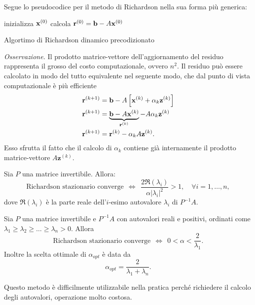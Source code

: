 Segue lo pseudocodice per il metodo di Richardson nella sua forma più generica: \\
\begin{algo}
	inizializza $\mathbf{x}^{(0)}$\;
	calcola $\mathbf{r}^{(0)} =\mathbf{b} -A\mathbf{x}^{(0)}$\;
	\caption{Algortimo di Richardson dinamico precodizionato}
\end{algo}
\textit{Osservazione.} Il prodotto matrice-vettore dell'aggiornamento del residuo rappresenta il grosso del costo computazionale, ovvero $n^{2}$. Il residuo può essere calcolato in modo del tutto equivalente nel seguente modo, che dal punto di vista computazionale è più efficiente
\begin{align*}
\mathbf{r}^{( k+1)} & =\mathbf{b} -A\left[\mathbf{x}^{(k)} +\alpha _{k}\mathbf{z}^{(k)}\right]\\
\mathbf{r}^{( k+1)} & =\underbrace{\mathbf{b} -A\mathbf{x}^{(k)}}_{\mathbf{r}^{(k)}} -A\alpha _{k}\mathbf{z}^{(k)}\\
\mathbf{r}^{( k+1)} & =\mathbf{r}^{(k)} -\alpha _{k} A\mathbf{z}^{(k)}.
\end{align*}
Esso sfrutta il fatto che il calcolo di $\alpha _{k}$ contiene già internamente il prodotto matrice-vettore $A\mathbf{z}^{(k)}$.
\begin{theorem}
Sia $P$ una matrice invertibile. Allora:
\begin{equation*}
\text{Richardson stazionario converge} \ \ \Leftrightarrow \ \ \frac{2\Re ( \lambda _{i})}{\alpha |\lambda _{i} |^{2}}  >1,\quad \forall i=1,\dotsc ,n,
\end{equation*}
dove $\Re ( \lambda _{i})$ è la parte reale dell'$i$-esimo autovalore $\lambda_i$ di $P^{-1} A$.
\end{theorem}
\begin{theorem}
Sia $P$ una matrice invertibile e $P^{-1} A$ con autovalori reali e positivi, ordinati come $\lambda _{1} \geqslant \lambda _{2} \geqslant \dotsc \geqslant \lambda _{n}  >0$. Allora
\begin{equation*}
\text{Richardson stazionario converge} \ \ \Leftrightarrow \ \ 0< \alpha < \frac{2}{\lambda _{1}} .
\end{equation*}
Inoltre la scelta ottimale di $\alpha _{opt}$ è data da
\begin{equation*}
\alpha _{opt} =\frac{2}{\lambda _{1} +\lambda _{n}} .
\end{equation*}
\end{theorem}
Questo metodo è difficilmente utilizzabile nella pratica perché richiedere il calcolo degli autovalori, operazione molto costosa.

